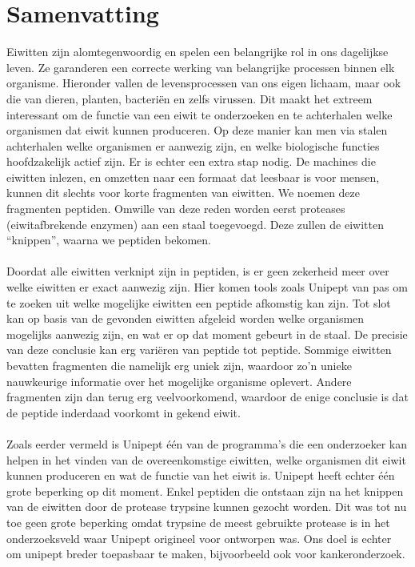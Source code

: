 \chapter*{Samenvatting}
Eiwitten zijn alomtegenwoordig en spelen een belangrijke rol in ons dagelijkse leven.
Ze garanderen een correcte werking van belangrijke processen binnen elk organisme.
Hieronder vallen de levensprocessen van ons eigen lichaam, maar ook die van dieren, planten, bacteriën en zelfs virussen.
Dit maakt het extreem interessant om de functie van een eiwit te onderzoeken en te achterhalen welke organismen dat eiwit kunnen produceren.
Op deze manier kan men via stalen achterhalen welke organismen er aanwezig zijn, en welke biologische functies hoofdzakelijk actief zijn.
Er is echter een extra stap nodig.
De machines die eiwitten inlezen, en omzetten naar een formaat dat leesbaar is voor mensen, kunnen dit slechts voor korte fragmenten van eiwitten.
We noemen deze fragmenten peptiden.
Omwille van deze reden worden eerst proteases (eiwitafbrekende enzymen) aan een staal toegevoegd.
Deze zullen de eiwitten ``knippen'', waarna we peptiden bekomen.
\\ \\
Doordat alle eiwitten verknipt zijn in peptiden, is er geen zekerheid meer over welke eiwitten er exact aanwezig zijn.
Hier komen tools zoals Unipept van pas om te zoeken uit welke mogelijke eiwitten een peptide afkomstig kan zijn.
Tot slot kan op basis van de gevonden eiwitten afgeleid worden welke organismen mogelijks aanwezig zijn, en wat er op dat moment gebeurt in de staal.
De precisie van deze conclusie kan erg variëren van peptide tot peptide.
Sommige eiwitten bevatten fragmenten die namelijk erg uniek zijn, waardoor zo'n unieke nauwkeurige informatie over het mogelijke organisme oplevert.
Andere fragmenten zijn dan terug erg veelvoorkomend, waardoor de enige conclusie is dat de peptide inderdaad voorkomt in gekend eiwit.
\\ \\
Zoals eerder vermeld is Unipept één van de programma's die een onderzoeker kan helpen in het vinden van de overeenkomstige eiwitten, welke organismen dit eiwit kunnen produceren en wat de functie van het eiwit is.
Unipept heeft echter één grote beperking op dit moment.
Enkel peptiden die ontstaan zijn na het knippen van de eiwitten door de protease trypsine kunnen gezocht worden.
Dit was tot nu toe geen grote beperking omdat trypsine de meest gebruikte protease is in het onderzoeksveld waar Unipept origineel voor ontworpen was.
Ons doel is echter om unipept breder toepasbaar te maken, bijvoorbeeld ook voor kankeronderzoek.
